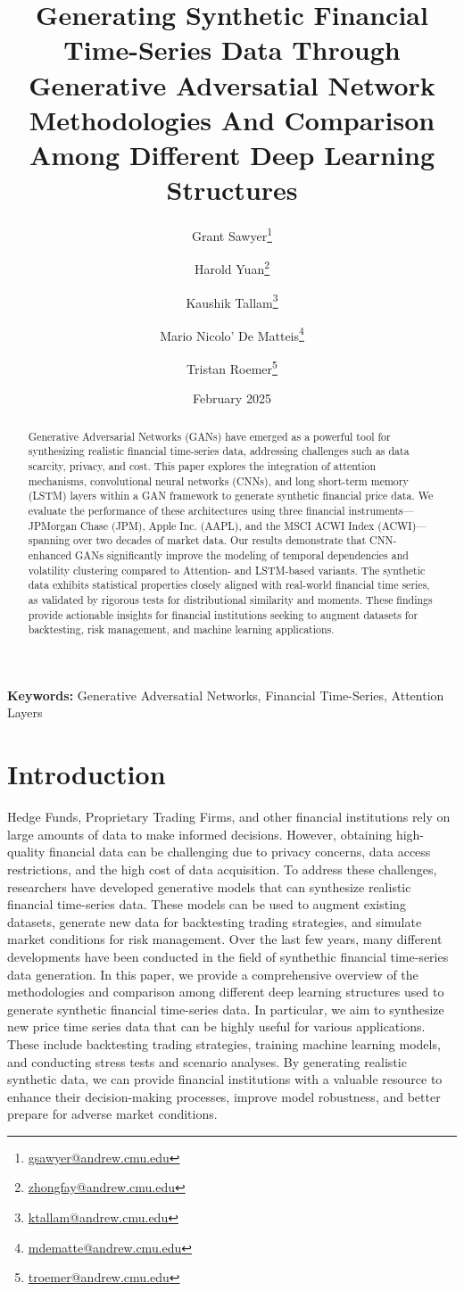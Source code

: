 \documentclass{article}
\title{Generating Synthetic Financial Time-Series Data Through Generative Adversatial Network\\[0.5em] \large Methodologies And Comparison Among Different Deep Learning Structures}
\author[1]{Grant Sawyer\thanks{\href{mailto:gsawyer@andrew.cmu.edu}{gsawyer@andrew.cmu.edu}}}
\author[1]{Harold Yuan\thanks{\href{mailto:zhongfay@andrew.cmu.edu}{zhongfay@andrew.cmu.edu}}}
\author[1]{Kaushik Tallam\thanks{\href{mailto:ktallam@andrew.cmu.edu}{ktallam@andrew.cmu.edu}}}
\author[1]{Mario Nicolo' De Matteis\thanks{\href{mailto:mdematte@andrew.cmu.edu}{mdematte@andrew.cmu.edu}}}
\author[1]{Tristan Roemer\thanks{\href{mailto:troemer@andrew.cmu.edu}{troemer@andrew.cmu.edu}}}
\affil[1]{Carnegie Mellon University, MSCF, New York, USA}
\date{February 2025}
\begin{document}
\maketitle

\begin{abstract}
    Generative Adversarial Networks (GANs) have emerged as a powerful tool for synthesizing realistic financial time-series data, addressing challenges such as data scarcity, privacy, and cost. This paper explores the integration of attention mechanisms, convolutional neural networks (CNNs), and long short-term memory (LSTM) layers within a GAN framework to generate synthetic financial price data. We evaluate the performance of these architectures using three financial instruments—JPMorgan Chase (JPM), Apple Inc. (AAPL), and the MSCI ACWI Index (ACWI)—spanning over two decades of market data. Our results demonstrate that CNN-enhanced GANs significantly improve the modeling of temporal dependencies and volatility clustering compared to Attention- and LSTM-based variants. The synthetic data exhibits statistical properties closely aligned with real-world financial time series, as validated by rigorous tests for distributional similarity and moments. These findings provide actionable insights for financial institutions seeking to augment datasets for backtesting, risk management, and machine learning applications.
\end{abstract}

\noindent \textbf{Keywords:} Generative Adversatial Networks, Financial Time-Series, Attention Layers

\section{Introduction}

Hedge Funds, Proprietary Trading Firms, and other financial institutions rely on large amounts of data to make informed decisions. However, obtaining high-quality financial data can be challenging due to privacy concerns, data access restrictions, and the high cost of data acquisition. To address these challenges, researchers have developed generative models that can synthesize realistic financial time-series data. These models can be used to augment existing datasets, generate new data for backtesting trading strategies, and simulate market conditions for risk management. Over the last few years, many different developments have been conducted in the field of synthethic financial time-series data generation. In this paper, we provide a comprehensive overview of the methodologies and comparison among different deep learning structures used to generate synthetic financial time-series data. In particular, we aim to synthesize new price time series data that can be highly useful for various applications. These include backtesting trading strategies, training machine learning models, and conducting stress tests and scenario analyses. By generating realistic synthetic data, we can provide financial institutions with a valuable resource to enhance their decision-making processes, improve model robustness, and better prepare for adverse market conditions.
\end{document}
